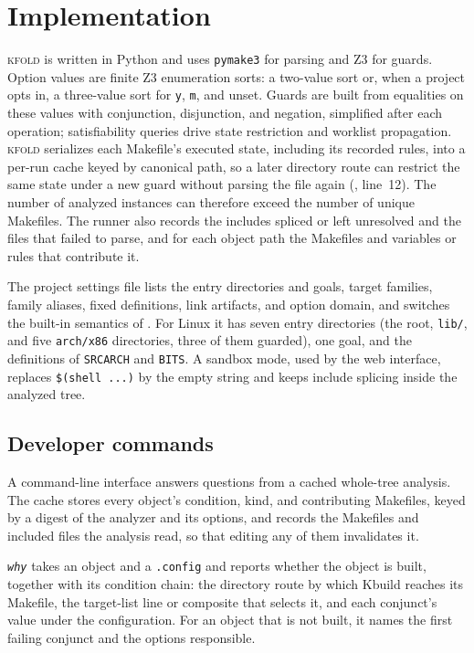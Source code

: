 \documentclass[acmsmall,screen,review]{acmart}
\newcommand{\tool}{\textsc{kfold}\xspace}
\begin{document}
\section{Implementation}
\label{sec:implementation}

\tool is written in Python and uses \texttt{pymake3} for parsing and Z3 for guards. Option values are finite Z3 enumeration sorts: a two-value sort or, when a project opts in, a three-value sort for \texttt{y}, \texttt{m}, and unset. Guards are built from equalities on these values with conjunction, disjunction, and negation, simplified after each operation; satisfiability queries drive state restriction and worklist propagation. \tool serializes each Makefile's executed state, including its recorded rules, into a per-run cache keyed by canonical path, so a later directory route can restrict the same state under a new guard without parsing the file again (, line~12). The number of analyzed instances can therefore exceed the number of unique Makefiles. The runner also records the includes spliced or left unresolved and the files that failed to parse, and for each object path the Makefiles and variables or rules that contribute it.

The project settings file lists the entry directories and goals, target families, family aliases, fixed definitions, link artifacts, and option domain, and switches the built-in semantics of . For Linux it has seven entry directories (the root, \texttt{lib/}, and five \texttt{arch/x86} directories, three of them guarded), one goal, and the definitions of \texttt{SRCARCH} and \texttt{BITS}. A sandbox mode, used by the web interface, replaces \texttt{\$(shell ...)} by the empty string and keeps include splicing inside the analyzed tree.

\subsection{Developer commands}
\label{sec:implementation:commands}
A command-line interface answers questions from a cached whole-tree analysis. The cache stores every object's condition, kind, and contributing Makefiles, keyed by a digest of the analyzer and its options, and records the Makefiles and included files the analysis read, so that editing any of them invalidates it.

\emph{\texttt{why}} takes an object and a \texttt{.config} and reports whether the object is built, together with its condition chain: the directory route by which Kbuild reaches its Makefile, the target-list line or composite that selects it, and each conjunct's value under the configuration. For an object that is not built, it names the first failing conjunct and the options responsible.
\end{document}
